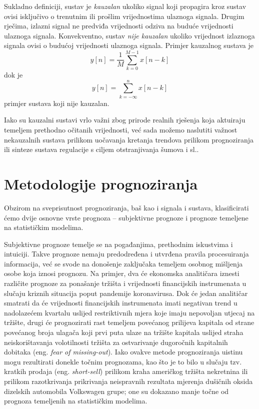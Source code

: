 \documentclass[a4paper,12pt,oneside]{memoir}
\newcommand{\kauzalni}{y[n]=\frac{1}{M}\displaystyle\sum_{k=0}^{M-1 }x[n-k]}
\newcommand{\nekauzalni}{y[n]=\displaystyle\sum_{k=-\infty}^{n}x[n-k]}
\begin{document}
                Sukladno definiciji, sustav je \textit{kauzalan} ukoliko signal koji propagira kroz sustav ovisi isključivo o trenutnim ili prošlim vrijednostima ulaznoga signala. Drugim rječima, izlazni signal ne predviđa vrijednosti odziva na buduće vrijednosti ulaznoga signala. Konvekventno, sustav \textit{nije kauzalan} ukoliko vrijednost izlaznoga signala ovisi o budućoj vrijednosti ulaznoga signala. Primjer kauzalnog sustava je
                \begin{equation}
                    \kauzalni
                \end{equation}
                dok je
                \begin{equation}
                    \nekauzalni
                \end{equation}
                primjer sustava koji nije kauzalan.

                Iako su kauzalni sustavi vrlo važni zbog prirode realnih rješenja koja aktuiraju temeljem prethodno očitanih vrijednosti, već sada možemo naslutiti važnost nekauzalnih sustava prilikom uočavanja kretanja trendova prilikom prognoziranja ili sinteze sustava regulacije s ciljem otstranjivanja šumova i sl..

        \section{Metodologije prognoziranja}%
            Obzirom na sveprisutnost prognoziranja, baš kao i signala i sustava, klasificirati ćemo dvije osnovne vrste prognoza -- subjektivne prognoze i prognoze temeljene na statističkim modelima.

            Subjektivne prognoze temelje se na pogađanjima, prethodnim iskustvima i intuiciji. Takve prognoze nemaju predodređena i utvrđena pravila procesuiranja informacija, već se svode na donošenje zaključaka temeljem osobnog mišljenja osobe koja iznosi prognozu. Na primjer, dva će ekonomska analitičara iznesti različite prognoze za ponašanje tržišta i vrijednosti financijskih instrumenata u slučaju kriznih situacija poput pandemije koronavirusa. Dok će jedan analitičar smatrati da će vrijednosti financijskih instrumenata imati negativan trend u nadolazećem kvartalu uslijed restriktivnih mjera koje imaju nepovoljan utjecaj na tržište, drugi će prognozirati rast temeljem povećanog prilijeva kapitala od strane povećanog broja ulagača koji prvi puta ulaze na tržište kapitala uslijed straha neiskorištavanja volotilnosti tržišta za ostvarivanje dugoročnih kapitalnih dobitaka (eng. \textit{fear of missing-out}). Iako ovakve metode prognoziranja uistinu mogu rezultirati donekle točnim prognozama, kao što je to bilo u slučaju tzv. kratkih prodaja (eng. \textit{short-sell}) prilikom kraha američkog tržišta nekretnina ili prilikom razotkrivanja prikrivanja neispravnih rezultata mjerenja dušičnih oksida dizelskih automobila Volkswagen grupe; one su dokazano manje točne od prognoza temeljenih na statističkim modelima.
\end{document}
